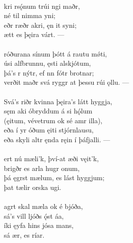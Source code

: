  \\

\bva {}kri rsǫ́num \hld trúi ngi maðr, \\%
\ind né til nimma yni; \\%
eðr ræðr akri, \hld ęn it syni; \\%
\ind {}ætt es þęira várt. —\\%

 \\

\bva {}róðurana sínum \hld þótt á rautu mǿti, \\%
úsi alfbrunnu, \hld {}ęsti alskjótum, \\%
þá's r nýtr, \hld ef nn fótr brotnar; \\%
verðit maðr svá ryggr \hld at þessu rúi ǫllu. —\\%

 \\

\bva Svá's riðr kvinna \hld þęira's látt hyggja, \\%
sęm aki  óbryddum \hld á si hǫ́lum \\%
(ęitum, vévetrum \hld ok sé amr illa), \\%
eða í yr óðum \hld {}ęiti stjórnlausu, \\%
eða skyli altr ęnda \hld {}ręin í þáfjalli. —\\%

 \\

\bva {}ert nú mæli'k, \hld því-at æði vęit'k, \\%
\ind brigðr es arla hugr onum, \\%
þá ęgrst mælum, \hld es lást hyggjum; \\%
\ind þat tælir orska ugi.\\%

 \\

\bva {}agrt skal mæla \hld ok é bjóða, \\%
\ind sá's vill ljóðs ǫ́st áa, \\%
íki ęyfa \hld hins jósa mans, \\%
\ind sá ær, es ríar.\\%

